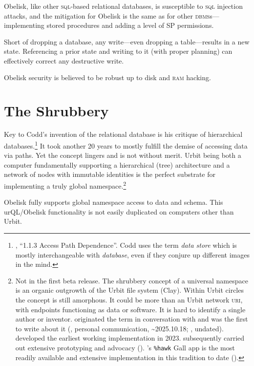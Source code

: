 \documentclass[twoside]{article}
\begin{document}
Obelisk, like other \textsc{sql}-based relational databases, is susceptible to \textsc{sql} injection attacks, and the mitigation for Obelisk is the same as for other \textsc{dbms}s---implementing stored procedures and adding a level of SP permissions.

Short of dropping a database, any write---even dropping a table---results in a new state. Referencing a prior state and writing to it (with proper planning) can effectively correct any destructive write.

Obelisk security is believed to be robust up to disk and \textsc{ram} hacking.

\section{The Shrubbery}

Key to Codd's invention of the relational database is his critique of hierarchical databases.\footnote{\citet{Codd1970}, ``1.1.3 Access Path Dependence''. Codd uses the term \emph{data store} which is mostly interchangeable with \emph{database}, even if they conjure up different images in the mind.} It took another 20 years to mostly fulfill the demise of accessing data via paths. Yet the concept lingers and is not without merit. Urbit being both a computer fundamentally supporting a hierarchical (tree) architecture and a network of nodes with immutable identities is the perfect substrate for implementing a truly global namespace.\footnote{Not in the first beta release. The shrubbery concept of a universal namespace is an organic outgrowth of the Urbit file system (Clay). Within Urbit circles the concept is still amorphous. It could be more than an Urbit network \textsc{uri}, with endpoints functioning as data or software. It is hard to identify a single author or inventor.  originated the term in conversation with  and was the first to write about it (, personal communication, \textasciitilde 2025.10.18; \citeauthor{Blackman_YoungShrub}, undated).  developed the earliest working implementation in 2023.  subsequently carried out extensive prototyping and advocacy (\citeyear{Fitzgerald_Shrub}). 's \texttt{\%hawk} Gall app is the most readily available and extensive implementation in this tradition to date (\citeyear{HanlenHawk}).}

Obelisk fully supports global namespace access to data and schema. This urQL/Obelisk functionality is not easily duplicated on computers other than Urbit.
\end{document}
